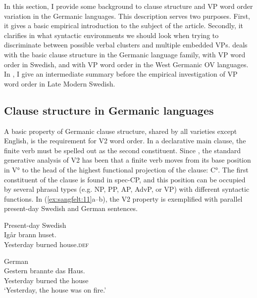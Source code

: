 \documentclass[output=paper, colorlinks, citecolor=brown]{langscibook}
\begin{document}
In this section, I provide some background to clause structure and VP word order variation in the Germanic languages. This description serves two purposes. First, it gives a basic empirical introduction to the subject of the article. Secondly, it clarifies in what syntactic environments we should look when trying to discriminate between possible verbal clusters and multiple embedded VPs.  deals with the basic clause structure in the Germanic language family,  with VP word order in Swedish, and  with VP word order in the West Germanic OV languages. In , I give an intermediate summary before the empirical investigation of VP word order in Late Modern Swedish.

\subsection{Clause structure in Germanic languages}\label{sec:sangfelt:3.1}

A basic property of Germanic clause structure, shared by all varieties except English, is the requirement for V2 word order. In a declarative main clause, the finite verb must be spelled out as the second constituent. Since \citet{denBesten1983}, the standard generative analysis of V2 has been that a finite verb moves from its base position in V° to the head of the highest functional projection of the clause: C°. The first constituent of the clause is found in spec-CP, and this position can be occupied by several phrasal types (e.g. NP, PP, AP, AdvP, or VP) with different syntactic functions. In (\ref{ex:sangfelt:11}a–b), the V2 property is exemplified with parallel present-day Swedish and German sentences.

\ea
\label{ex:sangfelt:11}
\begin{multicols}{2}\raggedcolumns
\ea Present-day Swedish\\
\gll Igår brann huset. \\
 Yesterday burned house.\textsc{def}\\\label{ex:sangfelt:11a}\columnbreak
 
\ex German\\
\gll Gestern brannte das Haus.\\
 Yesterday burned the house\\
\glt ‘Yesterday, the house was on fire.’\label{ex:sangfelt:11b}
\z 
\end{multicols}
\z 
\end{document}

